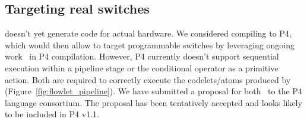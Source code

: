 \subsection{Targeting real switches}
\label{ss:real}
\pktlanguage doesn't yet generate code for actual hardware. We considered
compiling \pktlanguage to P4, which would then allow \pktlanguage to target
programmable switches by leveraging ongoing work~\cite{netronome,
xilinx,lavanya_compiler} in P4 compilation. However, P4 currently doesn't
support sequential execution within a pipeline stage or the conditional
operator as a primitive action. Both are required to correctly execute the
codelets/atoms produced by \pktlanguage (Figure~\ref{fig:flowlet_pipeline}).
We have submitted a proposal for both~\cite{p4-semantics} to the P4 language
consortium. The proposal has been tentatively accepted and looks likely to be
included in P4 v1.1.
